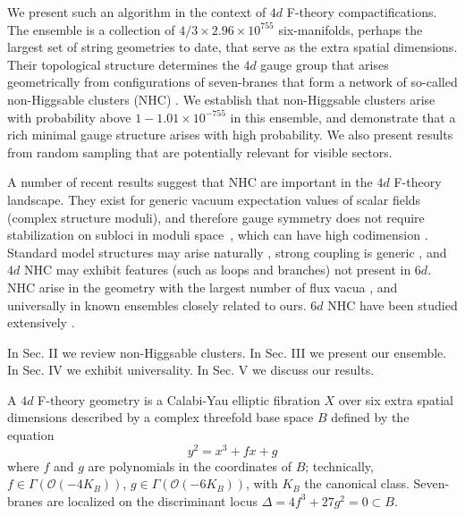 \documentclass[aps,prl,twocolumn, superscriptaddress,groupedaddress,nofootinbib]{revtex4-1}
\begin{document}
We present such an algorithm in the context of $4d$ F-theory \cite{Vafa:1996xn,*Morrison:1996pp,*Morrison:1996pp}
compactifications. The ensemble is a collection of
$4/3\times2.96\times 10^{755}$ six-manifolds, perhaps the largest set
of string geometries to date, that serve as the extra spatial dimensions. Their topological structure determines the $4d$ gauge group that arises 
geometrically from
configurations of seven-branes that form a network of so-called non-Higgsable
clusters (NHC) \cite{Morrison:2012np}. We establish that non-Higgsable clusters arise with
probability above $1-1.01\times 10^{-755}$ in this ensemble, and demonstrate that a rich minimal gauge structure arises with high probability. We also
present results from random sampling that are potentially relevant for
visible sectors.

A number of recent results suggest that NHC are 
important in the $4d$ F-theory landscape. They exist for generic vacuum expectation values of
 scalar fields (complex structure moduli), and therefore
gauge symmetry does not require stabilization on subloci in 
moduli space~\cite{Grassi:2014zxa}, which can have high codimension \cite{Braun:2014xka,*Watari:2015ysa,*Halverson:2016tve}. Standard model structures may arise naturally \cite{Grassi:2014zxa}, strong coupling is generic \cite{Halverson:2016vwx}, and $4d$ NHC may exhibit features \cite{Morrison:2014lca} (such as loops and branches) not present
in $6d$. NHC arise in the geometry with the largest number of flux
vacua \cite{Taylor:2015xtz}, and universally in known ensembles 
\cite{Halverson:2015jua,*Taylor:2015ppa}  closely related to ours.
$6d$ NHC have been studied extensively \cite{Morrison:2012np,Morrison:2012js,*Taylor:2012dr,*Morrison:2014era,*Martini:2014iza,*Johnson:2014xpa,*Taylor:2015isa}.

In Sec. II we review non-Higgsable clusters. In Sec. III we present our ensemble.
In Sec. IV we exhibit universality. In Sec. V we discuss our results.


\vspace{.2cm}
A $4d$ F-theory geometry is a Calabi-Yau elliptic fibration
$X$ over six extra spatial dimensions  described by a complex threefold base space $B$ defined by the equation
\begin{equation}
y^2=x^3+f x + g
\end{equation}
where $f$ and $g$ are polynomials in the coordinates
of $B$;  technically, $f\in \Gamma(\mathcal{O}(-4K_B))$, $g\in \Gamma(\mathcal{O}(-6K_B))$, with $K_B$ the canonical class.
Seven-branes are localized on the discriminant locus
$\Delta=4f^3+27g^2=0\subset B$.
\end{document}

